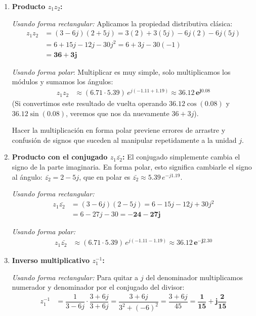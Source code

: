 \documentclass[10pt,a4paper]{article}
\begin{document}
	\begin{enumerate}[label=\textbf{\alph*)}]
		\item \textbf{Producto $z_1z_2$:}
		
		\textit{Usando forma rectangular:} Aplicamos la propiedad distributiva clásica:
		\begin{align*}
			z_1z_2 &= (3-6j)(2+5j) = 3(2) + 3(5j) - 6j(2) - 6j(5j) \\
			&= 6 + 15j - 12j - 30j^2 = 6 + 3j - 30(-1) \\
			&= \mathbf{36 + 3j}
		\end{align*}
		
		\textit{Usando forma polar}: Multiplicar es muy simple, solo multiplicamos los módulos y sumamos los ángulos:
		\begin{align*}
			z_1z_2 &\approx (6.71 \cdot 5.39)\, e^{j(-1.11 + 1.19)} \approx \mathbf{36.12\, e^{j0.08}}
		\end{align*}
        (Si convertimos este resultado de vuelta operando $36.12 \cos(0.08)$ y $36.12 \sin(0.08)$, veremos que nos da nuevamente $36 + 3j$).
		
		Hacer la multiplicación en forma polar previene errores de arrastre y confusión de signos que suceden al manipular repetidamente a la unidad $j$.
		
		\item \textbf{Producto con el conjugado $z_1\bar{z_2}$:}
		El conjugado simplemente cambia el signo de la parte imaginaria. En forma polar, esto significa cambiarle el signo al ángulo: $\bar{z_2} = 2-5j$, que en polar es $\bar{z_2} \approx 5.39\, e^{-j1.19}$.
		
        \textit{Usando forma rectangular:}
		\begin{align*}
			z_1\bar{z_2} &= (3-6j)(2-5j) = 6 - 15j - 12j + 30j^2 \\
			&= 6 - 27j - 30 = \mathbf{-24 - 27j}
		\end{align*}
        
        \textit{Usando forma polar:}
        \begin{align*}
			z_1\bar{z_2} &\approx (6.71 \cdot 5.39)\, e^{j(-1.11 - 1.19)} \approx \mathbf{36.12\, e^{-j2.30}}
		\end{align*}
		
		\item \textbf{Inverso multiplicativo $z_1^{-1}$:}
		
		\textit{Usando forma rectangular:} Para quitar a $j$ del denominador multiplicamos numerador y denominador por el conjugado del divisor:
		\begin{align*}
			z_1^{-1} &= \dfrac{1}{3-6j} \cdot \dfrac{3+6j}{3+6j} = \dfrac{3+6j}{3^2+(-6)^2} = \dfrac{3+6j}{45} = \mathbf{\dfrac{1}{15} + j\dfrac{2}{15}}
		\end{align*}
		

\end{enumerate}
\end{document}
